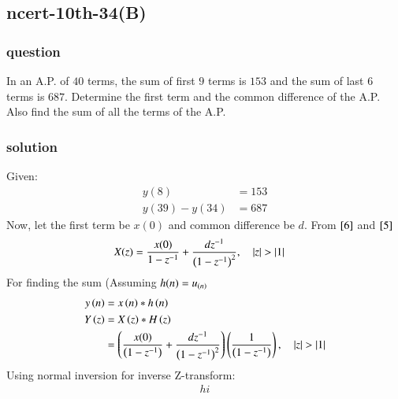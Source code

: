 \documentclass[journal,12pt,onecolumn]{IEEEtran}
\theoremstyle{remark}
\begin{document}
\subsection{ncert-10th-34(B)}
\subsubsection{question}
In an A.P. of $40$ terms, the sum of first $9$ terms is $153$ and the sum of last $6$ terms is $687$. Determine the first term and the common difference of the A.P. Also find the sum of all the terms of the A.P. 
\subsubsection{solution}
Given:
\begin{align}
y(8) &= 153 \label{17}\\
y(39)-y(34) &= 687 \label{18}
\end{align}
Now, let the first term be $x(0)$ and common difference be $d$. From $\eqref{6}$ and $\eqref{5}$
\begin{align}
    X(z) &= \dfrac{x(0)}{1-z^{-1}} + \dfrac{dz^{-1}}{\left(1-z^{-1}\right)^2} ,\quad \left\vert z\right\vert>\left\vert1\right\vert 
\end{align}
For finding the sum (Assuming $h(n)=u_{\left(n\right)}$
\begin{align}
    y\left(n\right) &= x\left(n\right) * h\left(n\right)\\
Y\left(z\right) &= X\left(z\right) * H\left(z\right)\\
&= \left(\frac{x(0)}{\left(1-z^{-1}\right)} +
\frac{dz^{-1}}{\left(1-z^{-1}\right)^{2}}\right)\left(\frac{1}{\left(1-z^{-1}\right)}\right)
,\quad \left\vert z\right\vert>\left\vert1\right\vert     
\end{align}
Using normal inversion for inverse Z-transform:
\begin{align}
   hi
\end{align}
\end{document}
